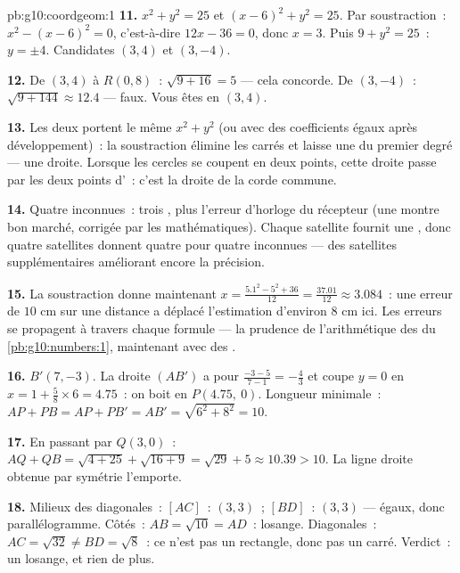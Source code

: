 \begin{solution}{pb:g10:coordgeom:1}
\textbf{11.} $x^2 + y^2 = 25$ et $(x - 6)^2 + y^2 = 25$. Par
soustraction~: $x^2 - (x - 6)^2 = 0$, c'est-à-dire $12x - 36 = 0$,
donc $x = 3$. Puis $9 + y^2 = 25$~: $y = \pm 4$. Candidates
$(3, 4)$ et $(3, -4)$.

\textbf{12.} De $(3, 4)$ à $R(0, 8)$~: $\sqrt{9 + 16} = 5$ --- cela
concorde. De $(3, -4)$~: $\sqrt{9 + 144} \approx 12.4$ --- faux. Vous
êtes en $(3, 4)$.

\textbf{13.} Les deux  portent le même $x^2 + y^2$ (ou avec
des coefficients égaux après développement)~: la soustraction élimine
les carrés et laisse une  du premier degré --- une droite.
Lorsque les cercles se coupent en deux points, cette droite passe par
les deux points d'~: c'est la droite de la corde commune.

\textbf{14.} Quatre inconnues~: trois , plus l'erreur
d'horloge du récepteur (une montre bon marché, corrigée par les
mathématiques). Chaque satellite fournit une , donc quatre
satellites donnent quatre  pour quatre inconnues --- des
satellites supplémentaires améliorant encore la précision.

\textbf{15.} La soustraction donne maintenant
$x = \frac{5.1^2 - 5^2 + 36}{12} = \frac{37.01}{12} \approx 3.084$~:
une erreur de $10$ cm sur une distance a déplacé l'estimation d'environ
$8$ cm ici. Les erreurs se propagent à travers chaque formule --- la
prudence de l'arithmétique des  du
\cref{pb:g10:numbers:1}, maintenant avec des .

\textbf{16.} $B' (7, -3)$. La droite $(AB')$ a pour  $\frac{-3 - 5}{7 - 1} = -\frac43$ et coupe $y = 0$ en
$x = 1 + \frac{5}{8} \times 6 = 4.75$~: on boit en
$P(4.75,\ 0)$. Longueur minimale~: $AP + PB = AP + PB' = AB' =
\sqrt{6^2 + 8^2} = 10$.

\textbf{17.} En passant par $Q(3, 0)$~:
$AQ + QB = \sqrt{4 + 25} + \sqrt{16 + 9} = \sqrt{29} + 5
\approx 10.39 > 10$. La ligne droite obtenue par symétrie l'emporte.

\textbf{18.} Milieux des diagonales~: $[AC]$~: $(3, 3)$~; $[BD]$~:
$(3, 3)$ --- égaux, donc parallélogramme. Côtés~:
$AB = \sqrt{10} = AD$~: losange. Diagonales~:
$AC = \sqrt{32} \neq BD = \sqrt{8}$~: ce n'est pas un rectangle, donc
pas un carré. Verdict~: un losange, et rien de plus.


\end{solution}
